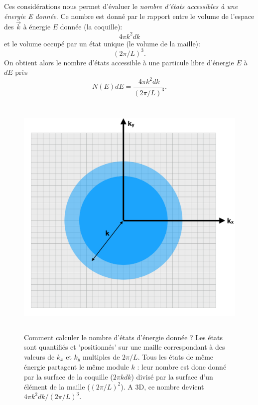 Ces considérations nous permet d'évaluer le \textit{nombre d'états accessibles à une énergie E donnée}. Ce nombre est donné par le rapport entre le volume de l'espace des $\vec k$ à énergie $E$ donnée (la coquille):
\begin{equation}
4\pi k^2 dk
\end{equation} 
et le volume occupé par un état unique (le volume de la maille):
\begin{equation}
(2\pi/L)^3.
\end{equation}
On obtient alors le nombre d'états accessible à une particule libre d'énergie $E$ à $dE$ près 
\begin{equation}
N(E)dE=\frac{4\pi k^2 dk}{(2\pi/L)^3}.
\label{e:densetat}
\end{equation}

\begin{figure}[htbp]
	\centering
		\includegraphics[height=12cm]{figs/k.png}
	\caption[Calcul de la densité d'état libres]{Comment calculer le nombre d'états d'énergie donnée ? Les états sont quantifiés et 'positionnés' sur une maille correspondant à des valeurs de $k_x$ et $k_y$ multiples de $2\pi/L$. Tous les états de même énergie partagent le même module $k$ : leur nombre est donc donné par la surface de la coquille ($2\pi k dk$) divisé par la surface d'un élément de la maille ($(2\pi/L)^2$). A 3D, ce nombre devient $4 \pi k^2 dk / (2\pi/L)^3$.}
	\label{f:k}
\end{figure}

